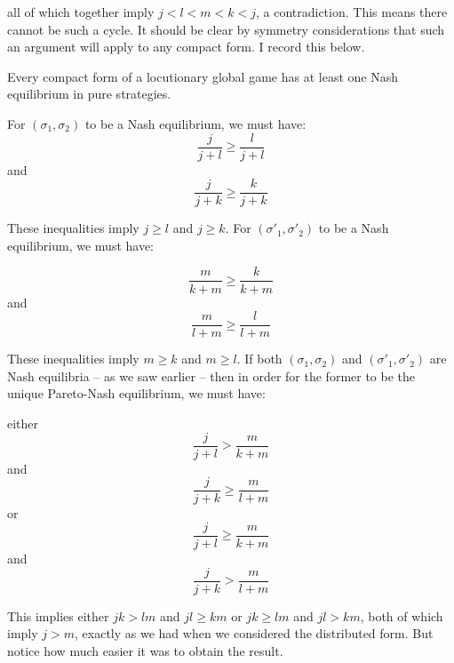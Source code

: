 \noindent all of which together imply $j < l < m < k < j$, a contradiction. This means there cannot be such a cycle. It should be clear by symmetry considerations that such an argument will apply to any compact form. I record this below.

\begin{theorem} \label{thm:two}
Every compact form of a locutionary global game has at least one Nash equilibrium in pure strategies.
\end{theorem}


For $(\sigma_1, \sigma_2)$ to be a Nash equilibrium, we must have:
\[ \frac{j}{j + l} \geq \frac{l}{j + l} \]
and
\[\frac{j}{j + k} \geq \frac{k}{j + k} \]

\noindent These inequalities imply $j \geq l$ and $j \geq k$. For $(\sigma'_1, \sigma'_2)$ to be a Nash equilibrium, we must have:

\[ \frac{m}{k + m} \geq \frac{k}{k + m} \]
and
\[\frac{m}{l + m} \geq \frac{l}{l + m} \]

\noindent These inequalities imply $m \geq k$ and $m \geq l$. If both $(\sigma_1, \sigma_2)$ and $(\sigma'_1, \sigma'_2)$ are Nash equilibria -- as we saw earlier -- then in order for the former to be the unique Pareto-Nash equilibrium, we must have: 

\noindent either
\[ \frac{j}{j + l} > \frac{m}{k + m} \]
and
\[\frac{j}{j + k} \geq \frac{m}{l + m} \]
or
\[ \frac{j}{j + l} \geq \frac{m}{k + m} \]
and
\[\frac{j}{j + k} > \frac{m}{l + m} \]

\noindent This implies either $jk > lm$ and $jl \geq km$ or $jk \geq lm$ and $jl > km$, both of which imply $j > m$, exactly as we had when we considered the distributed form. But notice how much easier it was to obtain the result.

